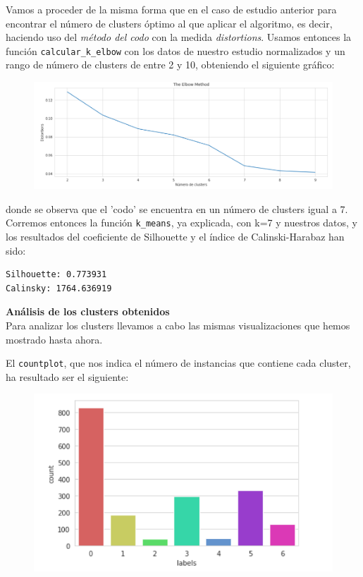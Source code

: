 \documentclass[a4paper,11pt]{book}
\begin{document}
Vamos a proceder de la misma forma que en el caso de estudio anterior para encontrar el número de clusters óptimo al que aplicar el algoritmo, es decir, haciendo uso del \textit{método del codo} con la medida \textit{distortions}. Usamos entonces la función \texttt{calcular_k_elbow} con los datos de nuestro estudio normalizados y un rango de número de clusters de entre 2 y 10, obteniendo el siguiente gráfico: 
\vspace{5cm}
\begin{figure}
	\centering
	\includegraphics[width=1\linewidth]{img/elbow2}
	\caption{}
	\label{fig:elbow2}
\end{figure}

donde se observa que el 'codo' se encuentra en un número de clusters igual a 7. Corremos entonces la función \texttt{k_means}, ya explicada, con k=7 y nuestros datos, y los resultados del coeficiente de Silhouette y el índice de Calinski-Harabaz han sido:
\begin{verbatim}
Silhouette: 0.773931
Calinsky: 1764.636919
\end{verbatim}

\textbf{Análisis de los clusters obtenidos}\\[0.03cm]

Para analizar los clusters llevamos a cabo las mismas visualizaciones que hemos mostrado hasta ahora. 

El \texttt{countplot}, que nos indica el número de instancias que contiene cada cluster, ha resultado ser el siguiente:

\begin{figure}[H]
	\centering
	\includegraphics[width=0.7\linewidth]{img/count2}
	\caption{}
	\label{fig:count2-}
\end{figure}
\end{document}
